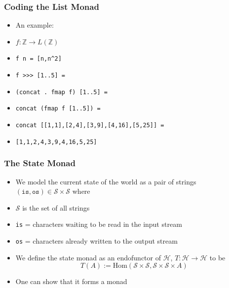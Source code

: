 \documentclass[xcolor=pdftex,dvipsnames,table]{beamer}
\renewcommand{\SS}{\ensuremath{\mathcal{S}}}
\newcommand{\typ}{\ensuremath{\mathcal{H}}}
\newcommand{\Hom}{\ensuremath{\mathrm{Hom}}}
\newcommand{\HSS}[1]{\ensuremath{\Hom( \SS\times\SS ,\SS\times\SS \times #1)}}
\newcommand{\Z}{\ensuremath{\mathbb{Z}}}
\begin{document}
\begin{frame}[fragile]
    \frametitle{Coding the List Monad}
    \begin{itemize}
        \item An example:
        \item $f : \Z \rightarrow L(\Z)$ \pause
        \item \verb|f n = [n,n^2]| \pause
        \item \verb|f >>> [1..5] =| \pause
        \item \verb|(concat . fmap f) [1..5] =| \pause
        \item \verb|concat (fmap f [1..5]) =| \pause
        \item \verb|concat [[1,1],[2,4],[3,9],[4,16],[5,25]] =| \pause
        \item \verb|[1,1,2,4,3,9,4,16,5,25]|
    \end{itemize}
\end{frame}

\begin{frame}
    \frametitle{The State Monad}
    \begin{itemize}
        \item We model the current state of the world as a pair of strings
            $\mathtt{(is,os)} \in \SS \times \SS$ where \pause
        \item $\SS$ is the set of all strings \pause
        \item \texttt{is} = characters waiting to be read in the input
            stream\pause
        \item \texttt{os} = characters already written to the output
            stream\pause
        \item We define the state monad as an endofunctor of \typ, \(
            T : \typ \rightarrow \typ\) to be \[ T(A) := \HSS{A} \]\pause
        \item One can show that it forms a monad
    \end{itemize}
\end{frame}
\end{document}
